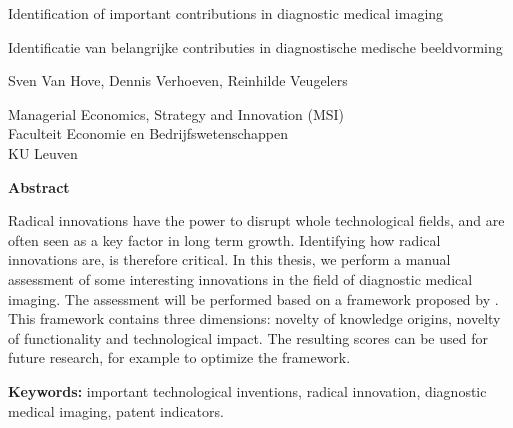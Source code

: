 
\cleardoublepage
\thispagestyle{plain}
\begin{center}
    \Huge 
    Identification of important contributions in diagnostic medical imaging
    
    \vspace{0.5cm}
    
    \large
    Identificatie van belangrijke contributies in diagnostische medische beeldvorming
    
    \vspace{1.0cm}
    
    Sven Van Hove, Dennis Verhoeven, Reinhilde Veugelers
    
    \vspace{0.5cm}
    
	Managerial Economics, Strategy and Innovation (MSI)\\
	Faculteit Economie en Bedrijfswetenschappen\\
	KU Leuven
    
    \vspace{1.0cm}
    \textbf{Abstract}
\end{center}

Radical innovations have the power to disrupt whole technological fields, and
are often seen as a key factor in long term growth. Identifying how radical
innovations are, is therefore critical. In this thesis, we perform a manual
assessment of some interesting innovations in the field of diagnostic medical
imaging. The assessment will be performed based on a framework proposed by
\cite{verhoeven}. This framework contains three dimensions: novelty of knowledge
origins, novelty of functionality  and technological impact. The resulting
scores can be used for future research, for example to optimize the framework.

\vspace{1.0cm}

\textbf{Keywords:} important technological inventions,
radical innovation, diagnostic medical imaging, patent indicators. 
